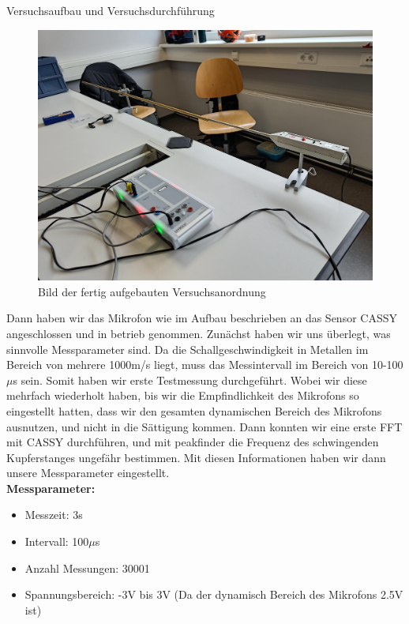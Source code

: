 \documentclass[twoside]{protokoll}
\begin{document}
\begin{aufgabe}{Versuchsaufbau und Versuchsdurchführung}
\begin{figure}[H]
  \centering
  \includegraphics[width=1\textwidth]{Bilder/434170_428396_1A3_Gesamtaufbau.pdf}
  \caption{Bild der fertig aufgebauten Versuchsanordnung}
  \centering
\end{figure}

Dann haben wir das Mikrofon wie im Aufbau beschrieben an das Sensor CASSY angeschlossen und in betrieb genommen. Zunächst haben wir uns überlegt, was sinnvolle Messparameter sind. Da die Schallgeschwindigkeit in Metallen im Bereich von mehrere 1000m/s liegt, muss das Messintervall im Bereich von 10-100$\mu$s sein. Somit haben wir erste Testmessung durchgeführt. Wobei wir diese mehrfach wiederholt haben, bis wir die Empfindlichkeit des Mikrofons so eingestellt hatten, dass wir den gesamten dynamischen Bereich des Mikrofons ausnutzen, und nicht in die Sättigung kommen. Dann konnten wir eine erste FFT mit CASSY durchführen, und mit peakfinder die Frequenz des schwingenden Kupferstanges ungefähr bestimmen. Mit diesen Informationen haben wir dann unsere Messparameter eingestellt.\\

\textbf{Messparameter:}
\begin{itemize}
\item Messzeit: 3s
\item Intervall: 100$\mu$s
\item Anzahl Messungen: 30001
\item Spannungsbereich: -3V bis 3V (Da der dynamisch Bereich des Mikrofons 2.5V ist)
\end{itemize}


\end{aufgabe}
\end{document}
